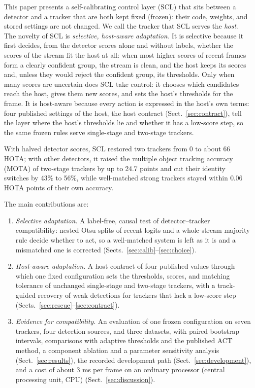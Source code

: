 \documentclass[pdflatex,sn-mathphys-num,iicol]{sn-jnl}
\newcommand{\scl}{SCL}
\begin{document}
This paper presents a self-calibrating control layer (\scl{}) that sits between a detector and a
tracker that are both kept fixed (frozen): their code, weights, and stored settings are not
changed. We call the tracker that \scl{} serves the \emph{host}. The novelty of \scl{} is
\emph{selective, host-aware adaptation}. It is selective because it first decides, from the
detector scores alone and without labels, whether the scores of the stream fit the host at all:
when most higher scores of recent frames form a clearly confident group, the stream is clean, and
the host keeps its scores and, unless they would reject the confident group, its thresholds. Only
when many scores are uncertain does \scl{} take control: it chooses which candidates reach the
host, gives them new scores, and sets the host's thresholds for the frame. It is host-aware because
every action is expressed in the host's own terms: four published settings of the host, the host
contract (Sect.~\ref{sec:contract}), tell the layer where the host's thresholds lie and whether it
has a low-score step, so the same frozen rules serve single-stage and two-stage trackers.

With halved detector scores, \scl{} restored two trackers from 0 to about 66 HOTA; with other
detectors, it raised the multiple object tracking accuracy (MOTA) of two-stage trackers by up to
24.7 points and cut their identity switches by 43\% to 56\%, while well-matched strong trackers
stayed within 0.06 HOTA points of their own accuracy.

The main contributions are:
\begin{enumerate}
\item \emph{Selective adaptation.} A label-free, causal test of detector--tracker compatibility:
      nested Otsu splits of recent logits and a whole-stream majority rule decide whether to act,
      so a well-matched system is left as it is and a mismatched one is corrected
      (Sects.~\ref{sec:calib}--\ref{sec:choice}).
\item \emph{Host-aware adaptation.} A host contract of four published values through which one
      fixed configuration sets the thresholds, scores, and matching tolerance of unchanged
      single-stage and two-stage trackers, with a track-guided recovery of weak detections for
      trackers that lack a low-score step (Sects.~\ref{sec:rescue}--\ref{sec:contract}).
\item \emph{Evidence for compatibility.} An evaluation of one frozen configuration on seven
      trackers, four detection sources, and three datasets, with paired bootstrap intervals,
      comparisons with adaptive thresholds and the published ACT method, a component ablation and a
      parameter sensitivity analysis (Sect.~\ref{sec:results}), the recorded development path
      (Sect.~\ref{sec:development}), and a cost of about 3 ms per frame on an ordinary processor
      (central processing unit, CPU) (Sect.~\ref{sec:discussion}).
\end{enumerate}
\end{document}
